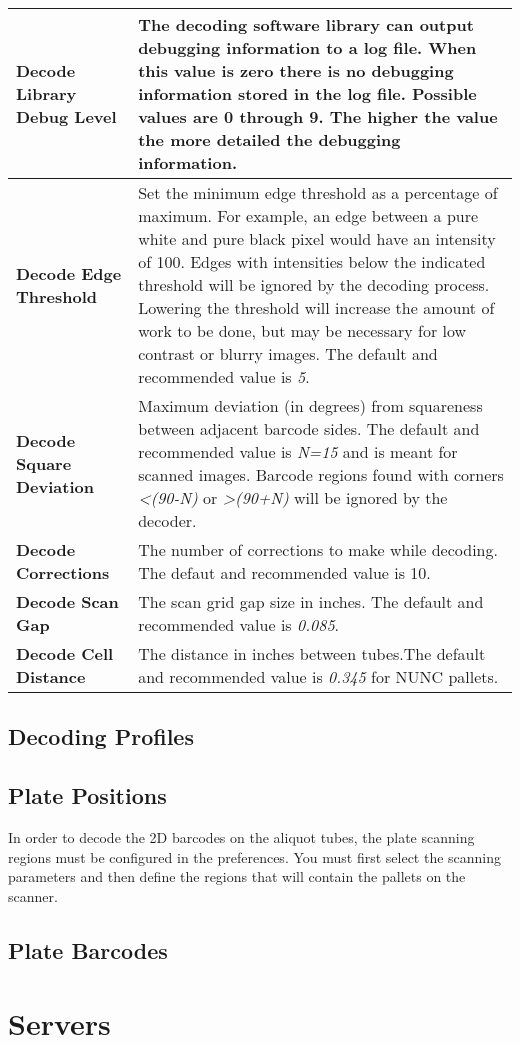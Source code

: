 \begin{center}
\begin{tabular}{|l|p{4in}|}
  \hline
  \textbf{Decode Library Debug Level} & The decoding software library can
  output debugging information to a log file. When this value is zero there is
  no debugging information stored in the log file. Possible values are 0
  through 9. The higher the value the more detailed the debugging information.\\
  \hline

  \textbf{Decode Edge Threshold} & Set the minimum edge threshold as a
  percentage of maximum. For example, an edge between a pure white and pure
  black pixel would have an intensity of 100.  Edges with intensities below the
  indicated threshold will be ignored by the decoding process. Lowering the
  threshold will increase the amount of work to be done, but may be necessary
  for low contrast or blurry images. The default and recommended value is
  \emph{5}.\\

  \hline

  \textbf{Decode Square Deviation} & Maximum deviation (in degrees) from
  squareness between adjacent barcode sides. The default and recommended value
  is \emph{N=15} and is meant for scanned images. Barcode regions found with
  corners \emph{<(90-N)} or \emph{>(90+N)} will be ignored by the decoder.\\

  \hline
  \textbf{Decode Corrections} &  The number of corrections to make while
  decoding. The defaut and recommended value is 10.\\
  \hline
  \textbf{Decode Scan Gap} & The scan grid gap size in inches. The
  default and recommended value is \emph{0.085}.\\
  \hline
  \textbf{Decode Cell Distance} & The distance in inches between tubes.The
  default and recommended value is \emph{0.345} for NUNC pallets.\\
  \hline
\end{tabular}
\end{center}

\subsection{Decoding Profiles}
\subsection{Plate Positions}
In order to decode the 2D barcodes on the aliquot tubes, the plate scanning
regions must be configured in the preferences. You must first select the
scanning parameters and then define the regions that will contain the pallets
on the scanner.
\subsection{Plate Barcodes}
\section{Servers}

